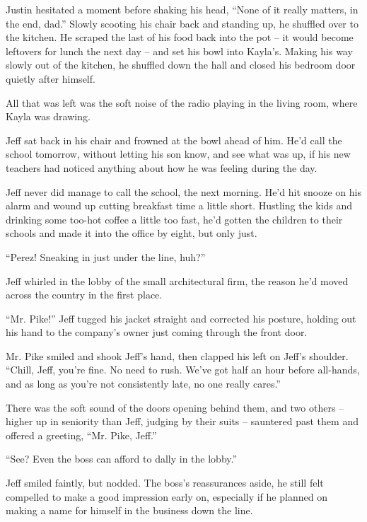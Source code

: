 Justin hesitated a moment before shaking his head, ``None of it really matters, in the end, dad.''  Slowly scooting his chair back and standing up, he shuffled over to the kitchen.  He scraped the last of his food back into the pot -- it would become leftovers for lunch the next day -- and set his bowl into Kayla's.  Making his way slowly out of the kitchen, he shuffled down the hall and closed his bedroom door quietly after himself.

All that was left was the soft noise of the radio playing in the living room, where Kayla was drawing.

Jeff sat back in his chair and frowned at the bowl ahead of him.  He'd call the school tomorrow, without letting his son know, and see what was up, if his new teachers had noticed anything about how he was feeling during the day.

\secdiv

Jeff never did manage to call the school, the next morning.  He'd hit snooze on his alarm and wound up cutting breakfast time a little short.  Hustling the kids and drinking some too-hot coffee a little too fast, he'd gotten the children to their schools and made it into the office by eight, but only just.

``Perez!  Sneaking in just under the line, huh?''

Jeff whirled in the lobby of the small architectural firm, the reason he'd moved across the country in the first place.

``Mr. Pike!''  Jeff tugged his jacket straight and corrected his posture, holding out his hand to the company's owner just coming through the front door.

Mr. Pike smiled and shook Jeff's hand, then clapped his left on Jeff's shoulder.  ``Chill, Jeff, you're fine.  No need to rush.  We've got half an hour before all-hands, and as long as you're not consistently late, no one really cares.''

There was the soft sound of the doors opening behind them, and two others -- higher up in seniority than Jeff, judging by their suits -- sauntered past them and offered a greeting, ``Mr. Pike, Jeff.''

``See?  Even the boss can afford to dally in the lobby.''

Jeff smiled faintly, but nodded.  The boss's reassurances aside, he still felt compelled to make a good impression early on, especially if he planned on making a name for himself in the business down the line.

